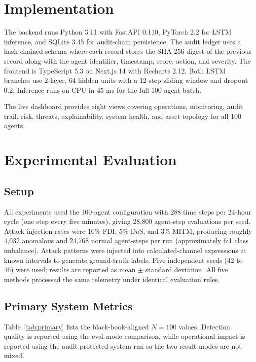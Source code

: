 \documentclass[conference,a4paper]{IEEEtran}
\begin{document}
\section{Implementation}

The backend runs Python 3.11 with FastAPI 0.110, PyTorch 2.2 for LSTM inference, and SQLite 3.45 for audit-chain persistence. The audit ledger uses a hash-chained schema where each record stores the SHA-256 digest of the previous record along with the agent identifier, timestamp, score, action, and severity. The frontend is TypeScript 5.3 on Next.js 14 with Recharts 2.12. Both LSTM branches use 2-layer, 64 hidden units with a 12-step sliding window and dropout 0.2. Inference runs on CPU in 45 ms for the full 100-agent batch.

The live dashboard provides eight views covering operations, monitoring, audit trail, risk, threats, explainability, system health, and asset topology for all 100 agents.

\section{Experimental Evaluation}

\subsection{Setup}

All experiments used the 100-agent configuration with 288 time steps per 24-hour cycle (one step every five minutes), giving 28,800 agent-step evaluations per seed. Attack injection rates were 10\% FDI, 5\% DoS, and 3\% MITM, producing roughly 4,032 anomalous and 24,768 normal agent-steps per run (approximately 6:1 class imbalance). Attack patterns were injected into calculated-channel expressions at known intervals to generate ground-truth labels. Five independent seeds (42 to 46) were used; results are reported as mean $\pm$ standard deviation. All five methods processed the same telemetry under identical evaluation rules.

\subsection{Primary System Metrics}

Table~\ref{tab:primary} lists the black-book-aligned $N=100$ values. Detection quality is reported using the eval-mode comparison, while operational impact is reported using the audit-protected system run so the two result modes are not mixed.
\end{document}
